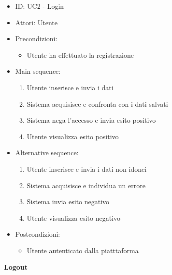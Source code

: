 \documentclass{article}
\begin{document}
\begin{itemize}[label = { }]
    \itemsep0px
    \item ID: UC2 - Login
    \item Attori: Utente
    \item Precondizioni: 
        \begin{itemize}[label = {-}]
            \item Utente ha effettuato la registrazione
        \end{itemize}
    \item Main sequence: 
        \begin{enumerate}
            \item Utente inserisce e invia i dati
            \item Sistema acquisisce e confronta con i dati salvati
            \item Sistema nega l'accesso e invia esito positivo
            \item Utente visualizza esito positivo
        \end{enumerate}
    \item Alternative sequence:
        \begin{enumerate}
            \item Utente inserisce e invia i dati non idonei
            \item Sistema acquisisce e individua un errore
            \item Sistema invia esito negativo
            \item Utente visualizza esito negativo
        \end{enumerate}
    \item Postcondizioni: 
        \begin{itemize}[label = {-}]
            \item Utente autenticato dalla piatttaforma
        \end{itemize}
\end{itemize}
\textbf{Logout}
\end{document}
